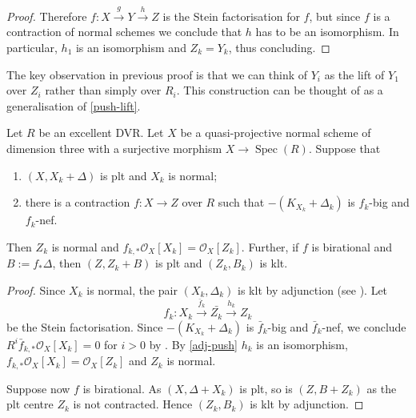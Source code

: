 \documentclass[a4paper,12pt]{book}
\DeclareMathOperator{\Spec}{Spec}
\newcommand{\ox}{\mathcal{O}_{X}}
\begin{document}
\begin{proof}
		Therefore $f \colon X \xrightarrow{g} Y \xrightarrow{h} Z$ is the Stein factorisation for $f$, but since $f$ is a contraction of normal schemes we conclude that $h$ has to be an isomorphism.
		In particular, $h_1$ is an isomorphism and $Z_{k}=Y_{k}$, thus concluding.
	\end{proof}
	
	
	\begin{remark}
		The key observation in previous proof is that we can think of $Y_{i}$ as the lift of $Y_{1}$ over $Z_{i}$ rather than simply over $R_{i}$. This construction can be thought of as a generalisation of \autoref{push-lift}.
	\end{remark}
	
	
	\begin{lemma}\label{invAdj2}
		Let $R$ be an excellent DVR.
		Let $X$ be a quasi-projective normal scheme of dimension three with a surjective morphism $X \to \Spec(R)$. Suppose that
		\begin{enumerate}
			\item $(X, X_k+\Delta)$ is plt and $X_k$ is normal;
			\item there is a contraction $f \colon X \to Z$ over $R$ such that $-(K_{X_{k}}+\Delta_{k})$ is $f_{k}$-big and $f_k$-nef.
		\end{enumerate}  
	Then $Z_{k}$ is normal and $f_{k,*}\ox[X_{k}]=\ox[Z_{k}]$. Further, if $f$ is birational and $B:=f_{*}\Delta$, then $(Z, Z_k+B)$ is plt and $(Z_{k},B_{k})$ is klt.
	\end{lemma}
	
	\begin{proof}
		Since $X_{k}$ is normal, the pair $(X_{k},\Delta_{k})$ is klt by adjunction (see \cite[Lemma 4.8]{kk-singbook}). 
		Let $$f_{k}\colon X_{k} \xrightarrow{\bar{f}_{k}} \bar{Z_k} \xrightarrow{h_k} Z_{k}$$ be the Stein factorisation. 
		Since $-(K_{X_{k}}+\Delta_{k})$ is $\bar{f}_{k}$-big and $\bar{f}_{k}$-nef, we conclude $R^{i}\bar{f}_{k,*}\ox[X_{k}]=0$ for $i> 0$ by \cite[Proposition 3.2]{Tan18}.
		By \autoref{adj-push} $h_k$ is an isomorphism, $f_{k,*}\ox[X_{k}]=\ox[Z_{k}]$ and $Z_{k}$ is normal.
		
		Suppose now $f$ is birational. As $(X,\Delta+X_k)$ is plt, so is $(Z,B+Z_k)$ as the plt centre $Z_k$ is not contracted. Hence $(Z_k,B_k)$ is klt by adjunction.			\end{proof}
	
\end{document}
